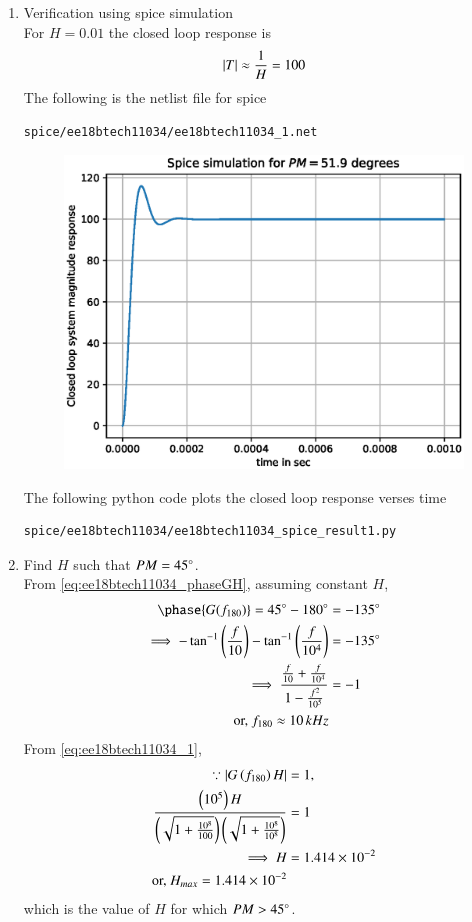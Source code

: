 \begin{enumerate}[label=\arabic*.,ref=\theenumi]
\item Verification using spice simulation\\
\solution For $H=0.01$ the closed loop response is
\begin{align}
\left\vert T\right\vert \approx \frac{1}{H} = 100
\end{align}
The following is the netlist file for spice
\begin{lstlisting}
spice/ee18btech11034/ee18btech11034_1.net
\end{lstlisting}
\begin{figure}[!h]
\centering
\includegraphics[width=\columnwidth]{./figs/ee18btech11034/ee18btech11034_spice_result1.eps}
\caption{}
\label{fig:ee18btech11034_spice_result1}
\end{figure}
The following python code plots the closed loop response verses time
\begin{lstlisting}
spice/ee18btech11034/ee18btech11034_spice_result1.py
\end{lstlisting}
%
\item Find $H$ such that $PM = 45\degree$.
\\
\solution From \eqref{eq:ee18btech11034_phaseGH},
assuming constant $H$,
\begin{align}
\phase{G(f_{180})} = 45\degree - 180 \degree &=  -135\degree
\\
\implies -\tan^{-1}\brak{\frac{f}{10}} -\tan^{-1}\brak{\frac{f}{10^{4}}}  &= -135\degree
\\
\implies     \frac{\frac{f}{10} + \frac{f}{10^{4}}}{1-\frac{f^2}{10^{5}}} &= -1
\\
\text{or, }    f_{180} \approx 10 \, kHz
\end{align}
From \eqref{eq:ee18btech11034_1},
\begin{align}
\because  \left\vert G\left(f_{180}\right)H\right\vert&=1,
\\
  \frac{\left(10^{5}\right)H}{\left(\sqrt{1+\frac{10^{8}}{100}}\right)\left(\sqrt{1+\frac{10^{8}}{10^{8}}}\right)} &= 1
\\
\implies     H &= 1.414 \times 10^{-2}
    \\
  \text{or, }  H_{max} =  1.414 \times 10^{-2}
\end{align}
which is the value of $H$ for which $PM > 45\degree$.


\end{enumerate}
